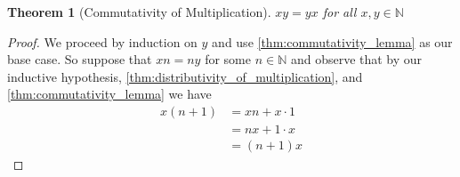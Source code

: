 \documentclass{article}
\theoremstyle{definition}
\theoremstyle{definition}
\theoremstyle{plain}
\theoremstyle{remark}
\theoremstyle{plain}
\newtheorem{theorem}{Theorem}[section]
\theoremstyle{remark}
\theoremstyle{plain}
\theoremstyle{plain}
\theoremstyle{plain}
\theoremstyle{plain}
\begin{document}
\begin{theorem}[Commutativity of Multiplication]
  \( xy = yx \) for all \( x, y \in \mathbb{N} \) 
\end{theorem}

\begin{proof}
  We proceed by induction on \( y \) and use \autoref{thm:commutativity_lemma}
  as our base case. So suppose that \(xn = ny\) for some \( n \in \mathbb{N} \) 
  and observe that by our inductive hypothesis, 
  \autoref{thm:distributivity_of_multiplication}, and 
  \autoref{thm:commutativity_lemma} we have
  \begin{align*}
    x(n+1) &= xn + x \cdot 1 \\
           &= nx + 1 \cdot x \\
           &= (n+1)x
  \end{align*}
\end{proof}



\end{document}
